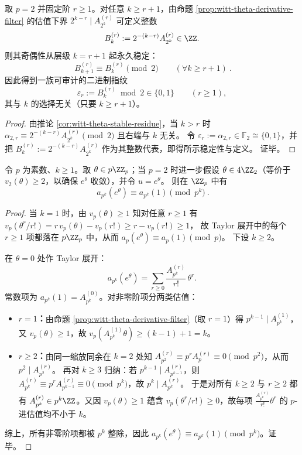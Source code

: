 \begin{corollary}[\texorpdfstring{$p=2$}{p=2} 的稳定奇偶指纹：由 \texorpdfstring{$\theta$}{theta}-导数生成一族无限二进制不变量]\label{cor:witt-theta-binary-fingerprint}
取 \(p=2\) 并固定阶 \(r\ge 1\)。对任意 \(k\ge r+1\)，由命题 \ref{prop:witt-theta-derivative-filter} 的估值下界 \(2^{k-r}\mid A_{2^k}^{(r)}\) 可定义整数
\[
B_k^{(r)}:=2^{-(k-r)}A_{2^k}^{(r)}\in\ZZ.
\]
则其奇偶性从层级 \(k=r+1\) 起永久稳定：
\[
\boxed{\ B_{k+1}^{(r)}\equiv B_{k}^{(r)}\pmod 2\qquad(\forall k\ge r+1)\ }.
\]
因此得到一族可审计的二进制指纹
\[
\varepsilon_r:=B_{k}^{(r)}\bmod 2\in\{0,1\}\qquad(r\ge 1),
\]
其与 \(k\) 的选择无关（只要 \(k\ge r+1\)）。
\end{corollary}
\begin{proof}
由推论 \ref{cor:witt-theta-stable-residue}，当 \(k>r\) 时
\(
\alpha_{2,r}\equiv 2^{-(k-r)}A_{2^k}^{(r)}\pmod 2
\)
且右端与 \(k\) 无关。
令 \(\varepsilon_r:=\alpha_{2,r}\in\mathbb{F}_2\cong\{0,1\}\)，并把
\(
B_k^{(r)}:=2^{-(k-r)}A_{2^k}^{(r)}
\)
作为其整数代表，即得所示稳定性与定义。
证毕。
\end{proof}

\begin{corollary}[\texorpdfstring{$p$}{p}-进平坦球：\texorpdfstring{$u=e^\theta$}{u=exp(theta)} 在 \texorpdfstring{$u=1$}{u=1} 附近的 \texorpdfstring{$p^k$}{p^k}-不敏感性]\label{cor:witt-padic-flatness-ball}
令 \(p\) 为素数、\(k\ge 1\)。取 \(\theta\in p\ZZ_p\)；当 \(p=2\) 时进一步假设 \(\theta\in 4\ZZ_2\)（等价于 \(v_2(\theta)\ge 2\)，以确保 \(e^\theta\) 收敛），并令 \(u=e^\theta\)。
则在 \(\ZZ_p\) 中有
\[
\boxed{\ a_{p^k}(e^\theta)\equiv a_{p^k}(1)\pmod{p^k}\ }.
\]
\end{corollary}
\begin{proof}
当 \(k=1\) 时，由 \(v_p(\theta)\ge 1\) 知对任意 \(r\ge 1\) 有
\(
v_p(\theta^r/r!)=r\,v_p(\theta)-v_p(r!)\ge r-v_p(r!)\ge 1
\)，
故 Taylor 展开中的每个 \(r\ge 1\) 项都落在 \(p\ZZ_p\) 中，从而
\(
a_p(e^\theta)\equiv a_p(1)\pmod p
\)。
下设 \(k\ge 2\)。

在 \(\theta=0\) 处作 Taylor 展开：
\[
a_{p^k}(e^\theta)=\sum_{r\ge 0}\frac{A_{p^k}^{(r)}}{r!}\,\theta^r.
\]
常数项为 \(a_{p^k}(1)=A_{p^k}^{(0)}\)。对非零阶项分两类估值：
\begin{itemize}
  \item \textbf{\(r=1\)：}由命题 \ref{prop:witt-theta-derivative-filter}（取 \(r=1\)）得 \(p^{k-1}\mid A_{p^k}^{(1)}\)，又 \(v_p(\theta)\ge 1\)，故
  \(v_p(A_{p^k}^{(1)}\theta)\ge (k-1)+1=k\)。
  \item \textbf{\(r\ge 2\)：}由同一缩放同余在 \(k=2\) 处知
  \(A_{p^2}^{(r)}\equiv p^rA_{p}^{(r)}\equiv 0\pmod{p^2}\)，从而 \(p^2\mid A_{p^2}^{(r)}\)。
  再对 \(k\ge 3\) 归纳：若 \(p^{k-1}\mid A_{p^{k-1}}^{(r)}\)，则
  \(A_{p^k}^{(r)}\equiv p^rA_{p^{k-1}}^{(r)}\equiv 0\pmod{p^k}\)，故 \(p^k\mid A_{p^k}^{(r)}\)。
  于是对所有 \(k\ge 2\) 与 \(r\ge 2\) 都有 \(A_{p^k}^{(r)}\in p^k\ZZ\)。又因 \(v_p(\theta)\ge 1\) 蕴含 \(v_p(\theta^r/r!)\ge 0\)，故每项 \(\frac{A_{p^k}^{(r)}}{r!}\theta^r\) 的 \(p\)-进估值均不小于 \(k\)。
\end{itemize}
综上，所有非零阶项都被 \(p^k\) 整除，因此 \(a_{p^k}(e^\theta)\equiv a_{p^k}(1)\pmod{p^k}\)。证毕。
\end{proof}

